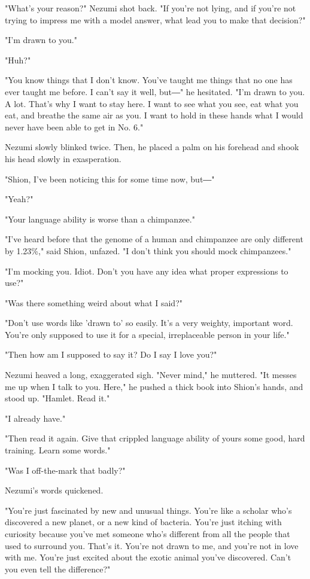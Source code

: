 "What's your reason?" Nezumi shot back. "If you're not lying, and if
you're not trying to impress me with a model answer, what lead you to
make that decision?"

"I'm drawn to you."

"Huh?"

"You know things that I don't know. You've taught me things that no one
has ever taught me before. I can't say it well, but―" he hesitated. "I'm
drawn to you. A lot. That's why I want to stay here. I want to see what
you see, eat what you eat, and breathe the same air as you. I want to
hold in these hands what I would never have been able to get in No. 6."

Nezumi slowly blinked twice. Then, he placed a palm on his forehead and
shook his head slowly in exasperation.

"Shion, I've been noticing this for some time now, but―"

"Yeah?"

"Your language ability is worse than a chimpanzee."

"I've heard before that the genome of a human and chimpanzee are only
different by 1.23\%," said Shion, unfazed. "I don't think you should
mock chimpanzees."

"I'm mocking you. Idiot. Don't you have any idea what proper expressions
to use?"

"Was there something weird about what I said?"

"Don't use words like 'drawn to' so easily. It's a very weighty,
important word. You're only supposed to use it for a special,
irreplaceable person in your life."

"Then how am I supposed to say it? Do I say I love you?"

Nezumi heaved a long, exaggerated sigh. "Never mind," he muttered. "It
messes me up when I talk to you. Here," he pushed a thick book into
Shion's hands, and stood up. "Hamlet. Read it."

"I already have."

"Then read it again. Give that crippled language ability of yours some
good, hard training. Learn some words."

"Was I off-the-mark that badly?"

Nezumi's words quickened.

"You're just fascinated by new and unusual things. You're like a scholar
who's discovered a new planet, or a new kind of bacteria. You're just
itching with curiosity because you've met someone who's different from
all the people that used to surround you. That's it. You're not drawn to
me, and you're not in love with me. You're just excited about the exotic
animal you've discovered. Can't you even tell the difference?"


